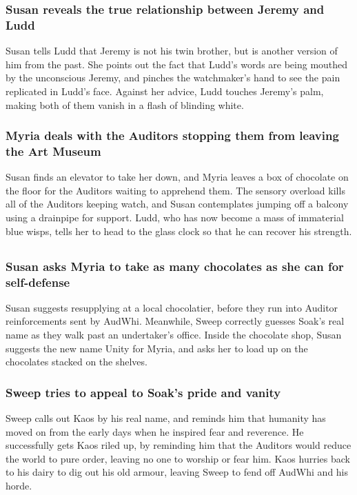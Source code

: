 \subsubsection{\Gls{Susan} reveals the true relationship between \Gls{Jeremy} and \Gls{Ludd}}
\Gls{Susan} tells \Gls{Ludd} that \Gls{Jeremy} is not his twin brother, but is another version of
him from the past. She points out the fact that \Gls{Ludd}'s words are being mouthed by the
unconscious \Gls{Jeremy}, and pinches the watchmaker's hand to see the pain replicated in
\Gls{Ludd}'s face. Against her advice, \Gls{Ludd} touches \Gls{Jeremy}'s palm, making both of them
vanish in a flash of blinding white.

\subsubsection{\Gls{Myria} deals with the Auditors stopping them from leaving the Art Museum}
\Gls{Susan} finds an elevator to take her down, and \Gls{Myria} leaves a box of chocolate on the
floor for the Auditors waiting to apprehend them. The sensory overload kills all of the Auditors
keeping watch, and \Gls{Susan} contemplates jumping off a balcony using a drainpipe for support.
\Gls{Ludd}, who has now become a mass of immaterial blue wisps, tells her to head to the glass
clock so that he can recover his strength.

\subsection{}
\subsubsection{\Gls{Susan} asks \Gls{Myria} to take as many chocolates as she can for self-defense}
\Gls{Susan} suggests resupplying at a local chocolatier, before they run into Auditor reinforcements
sent by \Gls{AudWhi}. Meanwhile, \Gls{Sweep} correctly guesses \Gls{Soak}'s real name as they walk
past an undertaker's office. Inside the chocolate shop, \Gls{Susan} suggests the new name
\Gls{Unity} for \Gls{Myria}, and asks her to load up on the chocolates stacked on the shelves.

\subsubsection{\Gls{Sweep} tries to appeal to \Gls{Soak}'s pride and vanity}
\Gls{Sweep} calls out \Gls{Kaos} by his real name, and reminds him that humanity has moved on from
the early days when he inspired fear and reverence. He successfully gets \Gls{Kaos} riled up, by
reminding him that the Auditors would reduce the world to pure order, leaving no one to worship or
fear him. \Gls{Kaos} hurries back to his dairy to dig out his old armour, leaving \Gls{Sweep} to
fend off \Gls{AudWhi} and his horde.

